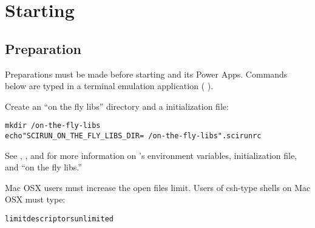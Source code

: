 %
%
%
%
%

%

\chapter{Starting \sr{}}
\label{ch:startingup}


\section{Preparation}
\label{sec:prepare}

Preparations must be made before starting \sr{} and its Power Apps.
Commands below are typed in a terminal emulation application (\eg{}
).

Create an ``on the fly libs'' directory and a \sr{}
initialization file:

\begin{alltt}
  mkdir ~/on-the-fly-libs
  echo "SCIRUN_ON_THE_FLY_LIBS_DIR=~/on-the-fly-libs"  .scirunrc
\end{alltt}

See , ,  and  for more information on \sr{}'s
environment variables, initialization file, and ``on the fly libs.''
  
Mac OSX users must increase the open files limit.
Users of csh-type shells on Mac OSX must type:

\begin{alltt}
  limit descriptors unlimited
\end{alltt}

